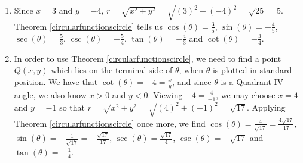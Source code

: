 {
\begin{enumerate}

\item    Since $x = 3$ and $y=-4$, $r = \sqrt{x^2 + y^2} = \sqrt{(3)^2+(-4)^2} = \sqrt{25} = 5$. Theorem \ref{circularfunctionscircle} tells us $\cos(\theta) = \frac{3}{5}$, $\sin(\theta) = -\frac{4}{5}$, $\sec(\theta) = \frac{5}{3}$, $\csc(\theta) = -\frac{5}{4}$, $\tan(\theta) = -\frac{4}{3}$ and $\cot(\theta) = - \frac{3}{4}$.

\item In order to use Theorem \ref{circularfunctionscircle}, we need to find a point $Q(x,y)$ which lies on the terminal side of $\theta$, when $\theta$ is plotted in standard position.  We have that $\cot(\theta) = -4 =  \frac{x}{y}$,  and since $\theta$ is a Quadrant IV angle, we also know $x>0$ and $y< 0$.  Viewing $-4 = \frac{4}{-1}$, we may choose   $x = 4$ and $y = -1$ so that $r = \sqrt{x^2+y^2} = \sqrt{(4)^2 + (-1)^2} = \sqrt{17}$.  Applying Theorem \ref{circularfunctionscircle} once more, we find $\cos(\theta) = \frac{4}{\sqrt{17}} = \frac{4 \sqrt{17}}{17}$,  $\sin(\theta) =- \frac{1}{\sqrt{17}} = -\frac{\sqrt{17}}{17}$, $\sec(\theta) = \frac{\sqrt{17}}{4}$, $\csc(\theta) = - \sqrt{17}$ and $\tan(\theta) = -\frac{1}{4}$.  

\end{enumerate}
}

\pagebreak

